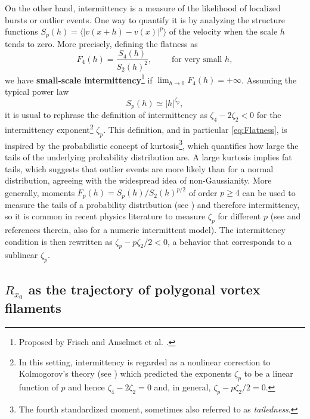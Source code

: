 \documentclass[11pt,reqno]{amsart}
\theoremstyle{definition}
\begin{document}
On the other hand, intermittency is a measure of the likelihood of localized bursts or outlier events.  
One way to quantify it is by analyzing the structure functions 
$S_p(h) = \langle |v(x+h) - v(x)|^p \rangle$ 
of the velocity when the scale $h$ tends to zero. 
More precisely, defining the flatness as
\begin{equation}\label{eq:Flatness}
F_4(h) = \frac{S_4(h)}{S_2(h)^2}, \qquad \text{ for very small } h, 
\end{equation}
we have \textbf{small-scale intermittency}\footnote{
Proposed by Frisch \cite[p.122, (8.2)]{Frisch1995} and Anselmet et al.
 \cite{AnselmetGagneHopfingerAntonia1984}.
} if $\lim_{h \to 0} F_4(h) = +\infty$. 
Assuming the typical power law 
\begin{equation}\label{eq:Zeta_p}
S_p(h) 
\simeq |h|^{\zeta_p}, 
\end{equation} 
it is usual to rephrase the definition of intermittency as $\zeta_4 - 2\zeta_2 < 0$ for the intermittency exponent\footnote{
In this setting, intermittency is regarded as a nonlinear correction to Kolmogorov's theory
(see \cite[Section 2.4]{BuckmasterVicol})
which predicted the exponents $\zeta_p$ to be a linear function of $p$ and hence $\zeta_4 - 2\zeta_2 = 0$ and, in general, $\zeta_p - p\zeta_2/2 = 0$.
}
$\zeta_p$. 
This definition, and in particular \eqref{eq:Flatness},
 is inspired by the probabilistic concept of kurtosis\footnote{The fourth standardized moment, sometimes also referred to as \textit{tailedness}.},
which quantifies how large the tails of the underlying probability distribution are.
A large kurtosis implies fat tails, which suggests that outlier events are more likely than for a normal distribution,  
agreeing with the widespread idea of non-Gaussianity. 
More generally, moments $F_p(h) = S_p(h)/S_2(h)^{p/2}$ of order $p \geq 4$ can be used to measure the tails of a probability distribution (see \cite[p.124]{Frisch1995}) and therefore intermittency, 
so it is common in recent physics literature to measure $\zeta_p$ for different $p$ 
(see \cite{RicardFalcon2023} and references therein, also \cite{ApolinarioChevillardMourrat2022} for a numeric intermittent model). 
The intermittency condition is then rewritten as $\zeta_p - p \zeta_2 /2 < 0$, a behavior that corresponds to a sublinear $\zeta_p$.





\subsection{$R_{x_0}$ as the trajectory of polygonal vortex filaments}
\label{sec:VFE}
\end{document}
